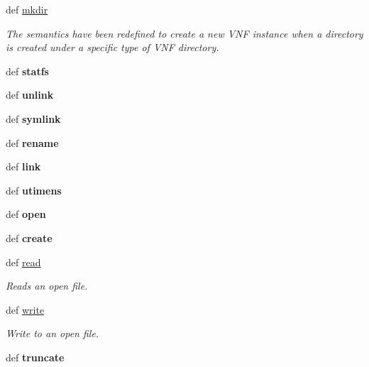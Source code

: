 \begin{DoxyCompactItemize}
\item 
def \hyperlink{classnfio_1_1Nfio_a03f752db91f0335cf0f29d81bda84b66}{mkdir}
\begin{DoxyCompactList}\small\item\em The semantics have been redefined to create a new V\-N\-F instance when a directory is created under a specific type of V\-N\-F directory. \end{DoxyCompactList}\item 
\hypertarget{classnfio_1_1Nfio_a65835e246a89861440548951f75278a8}{def {\bfseries statfs}}\label{classnfio_1_1Nfio_a65835e246a89861440548951f75278a8}

\item 
\hypertarget{classnfio_1_1Nfio_a316c7dd77e736d1db3c4f1d4ce752b5e}{def {\bfseries unlink}}\label{classnfio_1_1Nfio_a316c7dd77e736d1db3c4f1d4ce752b5e}

\item 
\hypertarget{classnfio_1_1Nfio_a67a77270fc5247a10d9e170f7f554139}{def {\bfseries symlink}}\label{classnfio_1_1Nfio_a67a77270fc5247a10d9e170f7f554139}

\item 
\hypertarget{classnfio_1_1Nfio_aec88d98d0a363cda41f0df74fab80d23}{def {\bfseries rename}}\label{classnfio_1_1Nfio_aec88d98d0a363cda41f0df74fab80d23}

\item 
\hypertarget{classnfio_1_1Nfio_ad56e16263c502849dcb2a32d8d8d42de}{def {\bfseries link}}\label{classnfio_1_1Nfio_ad56e16263c502849dcb2a32d8d8d42de}

\item 
\hypertarget{classnfio_1_1Nfio_a4614e16989b90bd79c6610211ae1694b}{def {\bfseries utimens}}\label{classnfio_1_1Nfio_a4614e16989b90bd79c6610211ae1694b}

\item 
\hypertarget{classnfio_1_1Nfio_a7f8141a10d199e0c7d4da91727fb2767}{def {\bfseries open}}\label{classnfio_1_1Nfio_a7f8141a10d199e0c7d4da91727fb2767}

\item 
\hypertarget{classnfio_1_1Nfio_a157f53007ef2e2afb63ee80e84f52eff}{def {\bfseries create}}\label{classnfio_1_1Nfio_a157f53007ef2e2afb63ee80e84f52eff}

\item 
def \hyperlink{classnfio_1_1Nfio_aa96de630c8da283fe30851e8d7b378a3}{read}
\begin{DoxyCompactList}\small\item\em Reads an open file. \end{DoxyCompactList}\item 
def \hyperlink{classnfio_1_1Nfio_a05cc0184ab93ef65958275c46e322137}{write}
\begin{DoxyCompactList}\small\item\em Write to an open file. \end{DoxyCompactList}\item 
\hypertarget{classnfio_1_1Nfio_ae8802c658b4df260e1c630aa9856011c}{def {\bfseries truncate}}\label{classnfio_1_1Nfio_ae8802c658b4df260e1c630aa9856011c}


\end{DoxyCompactItemize}
